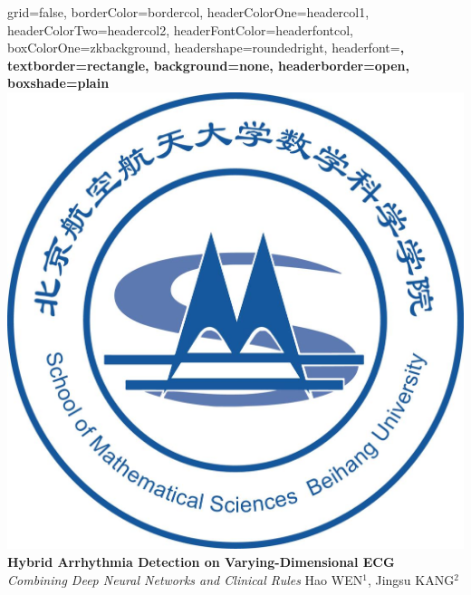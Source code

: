 \documentclass[a0paper,portrait]{baposter}
\begin{document}

\begin{poster}{
grid=false,
borderColor=bordercol, %
headerColorOne=headercol1, %
headerColorTwo=headercol2, %
headerFontColor=headerfontcol, %
boxColorOne=zkbackground,
headershape=roundedright, %
headerfont=\Large\sf\bf, %
textborder=rectangle,
background=none,
headerborder=open, %
boxshade=plain
}
%
%
{\includegraphics[scale=0.065]{images/logo_buaa_math.jpg}}
{
{\bf \fontsize{19pt}{19pt} \selectfont Hybrid Arrhythmia Detection on Varying-Dimensional ECG} \\
{\it \Large Combining Deep Neural Networks and Clinical Rules}
} %
{\vspace{0.3em} \smaller Hao WEN$^1$, Jingsu KANG$^2$   \\  %
  
}
\end{poster}
\end{document}
